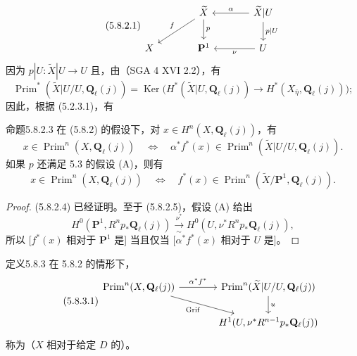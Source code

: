 \begin{equation}\tag{5.8.2.1}
\begin{tikzcd}[column sep=large]
&\widetilde X\arrow[dl,"f"']\arrow[d,"p"]&\widetilde X|U\arrow[l,"\alpha"']\arrow[d,"p|U"]\\
X&\mathbf P^1&U\arrow[l,"\nu"]
\end{tikzcd}
\end{equation}
因为 $p|U:\widetilde X|U\to U$ 且，由（SGA 4 XVI 2.2），有
\begin{equation}\tag{5.8.2.2}\operatorname{Prim}^*(\widetilde X|U/U,\mathbf Q_\ell(j))=\operatorname{Ker}\bigl(H^*(\widetilde X|U,\mathbf Q_\ell(j))\to H^*(X_{\bar\eta},\mathbf Q_\ell(j))\bigr);\end{equation}
因此，根据 (5.2.3.1)，有
\begin{SGAresult}{命题}{5.8.2.3}
在 (5.8.2) 的假设下，对 $x\in H^n(X,\mathbf Q_\ell(j))$，有
\begin{equation}\tag{5.8.2.4}x\in\operatorname{Prim}^n(X,\mathbf Q_\ell(j))\quad\Longleftrightarrow\quad\alpha^*f^*(x)\in\operatorname{Prim}^n(\widetilde X|U/U,\mathbf Q_\ell(j)).\end{equation}
如果 $p$ 还满足 5.3 的假设 (A)，则有
\begin{equation}\tag{5.8.2.5}x\in\operatorname{Prim}^n(X,\mathbf Q_\ell(j))\quad\Longleftrightarrow\quad f^*(x)\in\operatorname{Prim}^n(\widetilde X/\mathbf P^1,\mathbf Q_\ell(j)).\end{equation}
\end{SGAresult}
\begin{proof}
(5.8.2.4) 已经证明。至于 (5.8.2.5)，假设 (A) 给出
\[H^0(\mathbf P^1,R^np_*\mathbf Q_\ell(j))\xrightarrow[\sim]{\nu^*}H^0(U,\nu^*R^np_*\mathbf Q_\ell(j)),\]
所以 [$f^*(x)$ 相对于 $\mathbf P^1$ 是] 当且仅当 [$\alpha^*f^*(x)$ 相对于 $U$ 是]。
\end{proof}
\begin{SGAresult}{定义}{5.8.3}
在 5.8.2 的情形下，
\begin{equation}\tag{5.8.3.1}
\begin{tikzcd}[column sep=large]
\operatorname{Prim}^n(X,\mathbf Q_\ell(j))\arrow[r,"\alpha^*f^*"]\arrow[dr,"\operatorname{Grif}"']&\operatorname{Prim}^n(\widetilde X|U/U,\mathbf Q_\ell(j))\arrow[d,"u"]\\
&H^1(U,\nu^*R^{n-1}p_*\mathbf Q_\ell(j))
\end{tikzcd}
\end{equation}
称为（$X$ 相对于给定 $D$ 的）。
\end{SGAresult}
